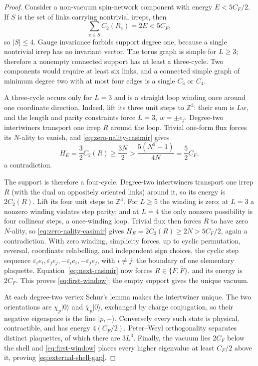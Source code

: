 \documentclass[11pt]{article}
\theoremstyle{plain}
\theoremstyle{definition}
\theoremstyle{remark}
\newcommand{\CF}{C_F}
\begin{document}
\begin{proof}
Consider a non-vacuum spin-network component with energy
$E<5\CF/2$. If $S$ is the set of links carrying nontrivial irreps, then
\[
 \sum_{e\in S}C_2(R_e)=2E<5\CF ,
\]
so $|S|\le4$. Gauge invariance forbids support degree one, because a single
nontrivial irrep has no invariant vector. The torus graph is simple for
$L\ge3$; therefore a nonempty connected support has at least a three-cycle.
Two components would require at least six links, and a connected simple graph
of minimum degree two with at most four edges is a single $C_3$ or $C_4$.

A three-cycle occurs only for $L=3$ and is a straight loop winding once around
one coordinate direction. Indeed, lift its three unit steps to $\mathbb Z^3$:
their sum is $Lw$, and the length and parity constraints force
$L=3$, $w=\pm e_j$. Degree-two intertwiners transport one irrep $R$ around
the loop. Trivial one-form flux forces its $N$-ality to vanish, and
 \eqref{eq:zero-nality-casimir} gives
 \[
  H_E=\frac32C_2(R)\ge\frac{3N}{2}
  >\frac{5(N^2-1)}{4N}=\frac52\CF,
 \]
 a contradiction.

The support is therefore a four-cycle. Degree-two intertwiners transport one
irrep $R$ (with the dual on oppositely oriented links) around it, so its energy
is $2C_2(R)$. Lift its four unit steps to $\mathbb Z^3$. For
$L\ge5$ the winding is zero; at $L=3$ a nonzero winding violates step parity;
and at $L=4$ the only nonzero possibility is four collinear steps, a
once-winding loop. Trivial flux then forces $R$ to have zero $N$-ality, so
\eqref{eq:zero-nality-casimir} gives
$H_E=2C_2(R)\ge2N>5\CF/2$, again a contradiction. With zero winding,
simplicity forces, up to cyclic permutation, reversal,
coordinate relabelling, and independent sign choices, the cyclic step sequence
$\varepsilon_i e_i,\varepsilon_j e_j,-\varepsilon_i e_i,
-\varepsilon_j e_j$, with $i\ne j$: the boundary of one elementary
plaquette. Equation~\eqref{eq:next-casimir} now forces
$R\in\{F,\bar F\}$, and its energy is $2\CF$. This proves
\eqref{eq:first-window}; the empty support gives the unique vacuum.

At each degree-two vertex Schur's lemma makes the intertwiner unique. The two
orientations are $\chi_p|0\rangle$ and $\bar\chi_p|0\rangle$, exchanged by
charge conjugation, so their negative eigenspace is the line
$|p,-\rangle$. Conversely every such state is physical, contractible, and
 has energy $4(\CF/2)$. Peter--Weyl orthogonality separates distinct
 plaquettes, of which there are $3L^3$.
Finally, the vacuum lies $2\CF$ below the shell and
\eqref{eq:first-window} places every higher eigenvalue at least $\CF/2$ above
it, proving \eqref{eq:external-shell-gap}.
\end{proof}
\end{document}
